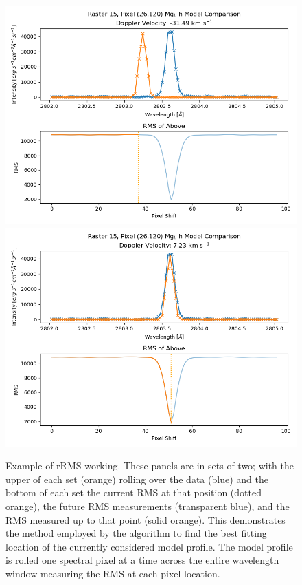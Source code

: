 \begin{figure}
    \centering
    \includegraphics*[width=.7956\linewidth]{./02Modelling1D/figs/20180419/rrms1.png}\\
    \includegraphics*[width=.7956\linewidth]{./02Modelling1D/figs/20180419/rrms2.png}
    \caption[Example of rRMS working.]{Example of rRMS working. These panels are in sets of two; with the upper of each set (orange) rolling over the data (blue) and the bottom of each set the current RMS at that position (dotted orange), the future RMS measurements (transparent blue), and the RMS measured up to that point (solid orange). This demonstrates the method employed by the algorithm to find the best fitting location of the currently considered model profile. The model profile is rolled one spectral pixel at a time across the entire wavelength window measuring the RMS at each pixel location.}
    \label{fig:rrms}
\end{figure}

